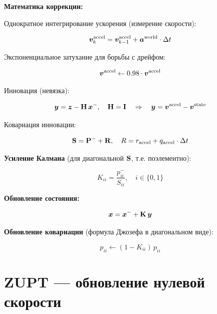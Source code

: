 \textbf{Математика коррекции:}

Однократное интегрирование ускорения (измерение скорости):

\begin{equation}
  \bm{v}^{\text{accel}}_{k} = \bm{v}^{\text{accel}}_{k-1}
  + \bm{a}^{\text{world}} \cdot \Delta t
  \label{eq:accel_integrate}
\end{equation}

Экспоненциальное затухание для борьбы с дрейфом:

\begin{equation}
  \bm{v}^{\text{accel}} \leftarrow 0.98 \cdot \bm{v}^{\text{accel}}
  \label{eq:decay}
\end{equation}

Инновация (невязка):

\begin{equation}
  \bm{y} = \bm{z} - \mathbf{H}\,\bm{x}^-, \quad \mathbf{H} = \mathbf{I}
  \quad\Rightarrow\quad
  \bm{y} = \bm{v}^{\text{accel}} - \bm{v}^{\text{state}}
  \label{eq:innovation}
\end{equation}

Ковариация инновации:

\begin{equation}
  \mathbf{S} = \mathbf{P}^- + \mathbf{R}, \quad
  R = r_{\text{accel}} + q_{\text{accel}} \cdot \Delta t
  \label{eq:S_matrix}
\end{equation}

\textbf{Усиление Калмана} (для диагональной $\mathbf{S}$, т.е. поэлементно):

\begin{equation}
  \boxed{K_{ii} = \frac{p_{ii}^-}{S_{ii}}, \quad i \in \{0,1\}}
  \label{eq:kalman_gain}
\end{equation}

\textbf{Обновление состояния:}

\begin{equation}
  \bm{x} = \bm{x}^- + \mathbf{K}\,\bm{y}
  \label{eq:state_update}
\end{equation}

\textbf{Обновление ковариации} (формула Джозефа в диагональном виде):

\begin{equation}
  \boxed{p_{ii} \leftarrow (1 - K_{ii})\,p_{ii}}
  \label{eq:cov_update}
\end{equation}

\section{ZUPT --- обновление нулевой скорости}

